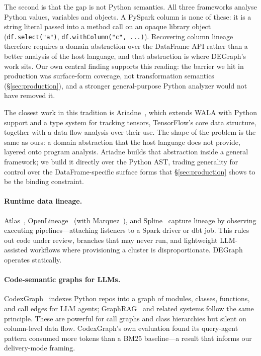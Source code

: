 \documentclass[11pt]{article}
\newcommand{\code}[1]{\texttt{#1}}
\begin{document}
The second is that the gap is not Python semantics. All three frameworks analyse Python
values, variables and objects. A PySpark column is none of these: it is a string literal
passed into a method call on an opaque library object (\code{df.select("a")},
\code{df.withColumn("c", ...)}). Recovering column lineage therefore requires a domain
abstraction over the DataFrame API rather than a better analysis of the host language, and
that abstraction is where DEGraph's work sits. Our own central finding supports this
reading: the barrier we hit in production was surface-form coverage, not transformation
semantics (\S\ref{sec:production}), and a stronger general-purpose Python analyzer would not
have removed it.

The closest work in this tradition is Ariadne~\cite{ariadne}, which extends WALA with Python
support and a type system for tracking tensors, TensorFlow's core data structure, together
with a data flow analysis over their use. The shape of the problem is the same as ours: a
domain abstraction that the host language does not provide, layered onto program analysis.
Ariadne builds that abstraction inside a general framework; we build it directly over the
Python AST, trading generality for control over the DataFrame-specific surface forms that
\S\ref{sec:production} shows to be the binding constraint.

\paragraph{Runtime data lineage.} Atlas~\cite{atlas}, OpenLineage~\cite{ol} (with
Marquez~\cite{marquez}), and Spline~\cite{spline} capture lineage by observing
executing pipelines---attaching listeners to a Spark driver or dbt job. This rules
out code under review, branches that may never run, and lightweight LLM-assisted
workflows where provisioning a cluster is disproportionate. DEGraph operates
statically.

\paragraph{Code-semantic graphs for LLMs.} CodexGraph~\cite{codexgraph} indexes
Python repos into a graph of modules, classes, functions, and call edges for LLM
agents; GraphRAG~\cite{graphrag} and related systems follow the same principle.
These are powerful for call graphs and class hierarchies but silent on column-level
data flow. CodexGraph's own evaluation found its query-agent pattern consumed more
tokens than a BM25 baseline---a result that informs our delivery-mode framing.
\end{document}
